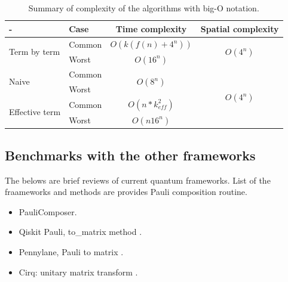 \documentclass[twocolumn]{article}
\begin{document}
\begin{table}
    \centering
    \caption{Summary of complexity of the algorithms with big-O notation.}
    \label{table:complexity}
    \begin{tabular}{l|l|cc}
        -                                & Case      & Time complexity                   & Spatial complexity\\
        \hline
        \multirow{2}{8em}{Term by term}  & Common    & $O(k(f(n) +4^n))$                 & \multirow{2}{2em}{$O(4^n)$}\\
                                         & Worst     & $O(16^n)$                         &\\
        \multirow{2}{8em}{Naive}         & Common    &\multirow{2}{1em}{$O(8^n)$}        & \multirow{4}{2em}{$O(4^n)$}\\
                                         & Worst     &                                   &\\
        \multirow{2}{8em}{Effective term}& Common    &$O(n * k_{eff}^2)$                 & \\
                                         & Worst     &$O(n16^n)$                         & \\
        \hline                                      
    \end{tabular}
\end{table}


\subsection{Benchmarks with the other frameworks}

The belows are brief reviews of current quantum frameworks.
List of the fraameworks and methods are provides Pauli composition routine.

\begin{itemize}
    \item PauliComposer\cite{vidal_romero_paulicomposer_2023}.
    \item Qiskit Pauli, to\_matrix method \cite{Qiskit}.
    \item Pennylane, Pauli to matrix \cite{bergholm2018pennylane}. %
    \item Cirq: unitary matrix transform \cite{cirq_developers_2023_10247207}. %
\end{itemize}
\end{document}
